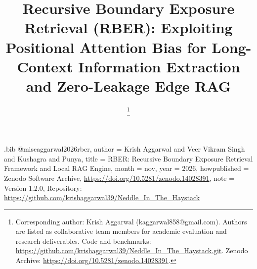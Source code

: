 \begin{filecontents*}{\jobname.bib}
@misc{aggarwal2026rber,
  author       = {Krish Aggarwal and Veer Vikram Singh and Kushagra and Punya},
  title        = {{RBER}: Recursive Boundary Exposure Retrieval Framework and Local {RAG} Engine},
  month        = nov,
  year         = {2026},
  howpublished = {Zenodo Software Archive, \url{https://doi.org/10.5281/zenodo.14028391}},
  note         = {Version 1.2.0, Repository: \url{https://github.com/krishaggarwal39/Neddle_In_The_Haystack}}
}
\end{filecontents*}

\documentclass[conference]{IEEEtran}
\IEEEoverridecommandlockouts

\usepackage[T1]{fontenc}

\usepackage{cite}
\usepackage{amsmath,amssymb,amsfonts,amsthm}
\usepackage{algorithmic}
\usepackage{algorithm}
\usepackage{graphicx}
\usepackage{textcomp}
\usepackage{xcolor}
\usepackage{booktabs}
\usepackage{tabularx}
\usepackage{multirow}
\usepackage{url}
\usepackage[hidelinks]{hyperref}
\usepackage{microtype}
\usepackage{balance}
\usepackage{tikz}
\usetikzlibrary{shapes.geometric,arrows.meta,positioning,calc,fit,backgrounds,decorations.pathreplacing,patterns,plotmarks}
\usepackage{tcolorbox}

\newtheorem{theorem}{Theorem}
\newtheorem{lemma}{Lemma}
\newtheorem{definition}{Definition}
\newtheorem{corollary}{Corollary}

\newcommand{\RBER}{\textsf{RBER}}
\newcommand{\norm}[1]{\left\lVert#1\right\rVert}



\title{Recursive Boundary Exposure Retrieval (RBER): Exploiting Positional Attention Bias for Long-Context Information Extraction and Zero-Leakage Edge RAG}

\author{
    \thanks{Corresponding author: Krish Aggarwal (kaggarwal858@gmail.com). Authors are listed as collaborative team members for academic evaluation and research deliverables. Code and benchmarks: \url{https://github.com/krishaggarwal39/Neddle_In_The_Haystack.git}. Zenodo Archive: \url{https://doi.org/10.5281/zenodo.14028391}.}
}

